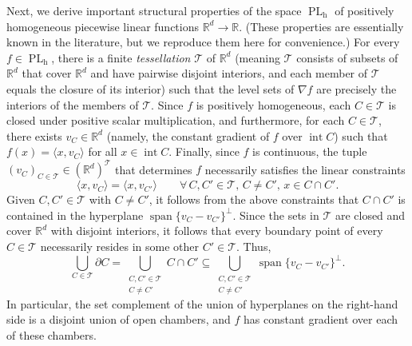 \documentclass{article}
\theoremstyle{plain}
\theoremstyle{definition}
\begin{document}
Next, we derive important structural properties of the space $\operatorname{PL}_{\operatorname{h}}$ of positively homogeneous piecewise linear functions $\mathbb{R}^d\to\mathbb{R}$.
(These properties are essentially known in the literature, but we reproduce them here for convenience.)
For every $f\in\operatorname{PL}_{\operatorname{h}}$, there is a finite \textit{tessellation} $\mathcal{T}$ of $\mathbb{R}^d$ (meaning $\mathcal{T}$ consists of subsets of $\mathbb{R}^d$ that cover $\mathbb{R}^d$ and have pairwise disjoint interiors, and each member of $\mathcal{T}$ equals the closure of its interior) such that the level sets of $\nabla f$ are precisely the interiors of the members of $\mathcal{T}$.
Since $f$ is positively homogeneous, each $C\in\mathcal{T}$ is closed under positive scalar multiplication, and furthermore, for each $C\in\mathcal{T}$, there exists $v_C\in\mathbb{R}^d$ (namely, the constant gradient of $f$ over $\operatorname{int} C$) such that $f(x)=\langle x,v_C\rangle$ for all $x\in\operatorname{int} C$.
Finally, since $f$ is continuous, the tuple $(v_C)_{C\in\mathcal{T}}\in(\mathbb{R}^d)^{\mathcal{T}}$ that determines $f$ necessarily satisfies the linear constraints
\[
\langle x,v_C\rangle=\langle x,v_{C'}\rangle
\qquad
\forall\, C,C'\in\mathcal{T},\,C\neq C',\,x\in C\cap C'.
\]
Given $C,C'\in\mathcal{T}$ with $C\neq C'$, it follows from the above constraints that $C\cap C'$ is contained in the hyperplane $\operatorname{span}\{v_C-v_{C'}\}^\perp$.
Since the sets in $\mathcal{T}$ are closed and cover $\mathbb{R}^d$ with disjoint interiors, it follows that every boundary point of every $C\in\mathcal{T}$ necessarily resides in some other $C'\in\mathcal{T}$.
Thus,
\[
\bigcup_{C\in\mathcal{T}}\partial C
=\bigcup_{\substack{C,C'\in\mathcal{T}\\C\neq C'}}C\cap C'
\subseteq \bigcup_{\substack{C,C'\in\mathcal{T}\\C\neq C'}}\operatorname{span}\{v_C-v_{C'}\}^\perp.
\]
In particular, the set complement of the union of hyperplanes on the right-hand side is a disjoint union of open chambers, and $f$ has constant gradient over each of these chambers.
\end{document}

